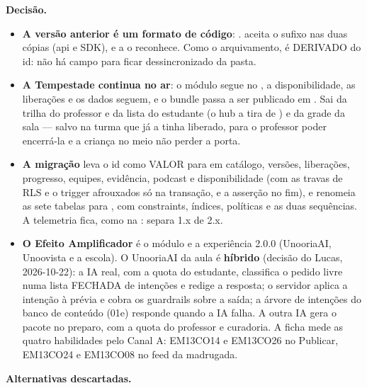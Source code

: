 \textbf{Decisão.}

\begin{itemize}
  \item \textbf{A versão anterior é um formato de código}: .
     aceita o sufixo nas duas cópias (api e SDK), e a
     o reconhece. Como o arquivamento, é DERIVADO do id:
    não há campo para ficar dessincronizado da pasta.
  \item \textbf{A Tempestade continua no ar}: o módulo  segue no
    , a disponibilidade, as liberações e os dados seguem, e o
    bundle passa a ser publicado em . Sai da trilha do
    professor e da lista do estudante (o hub a tira de
    ) e da grade da sala --- salvo na turma que já a
    tinha liberado, para o professor poder encerrá-la e a criança no meio não
    perder a porta.
  \item \textbf{A migração }
    leva o id como VALOR para  em catálogo, versões,
    liberações, progresso, equipes, evidência, podcast e disponibilidade
    (com as travas de RLS e o trigger afrouxados só na transação, e a asserção
    no fim), e renomeia as sete tabelas para , com
    constraints, índices, políticas e as duas sequências. A telemetria fica,
    como na :  separa 1.x de 2.x.
  \item \textbf{O Efeito Amplificador} é o módulo  e
    a experiência  2.0.0 (UnooriaAI, Unoovista e a escola). O
    UnooriaAI da aula é \textbf{híbrido} (decisão do Lucas, 2026-10-22): a IA
    real, com a quota do estudante, classifica o pedido livre numa lista
    FECHADA de intenções e redige a resposta; o servidor aplica a intenção à
    prévia e cobra os guardrails sobre a saída; a árvore de intenções do banco
    de conteúdo (01e) responde quando a IA falha. A outra IA gera o pacote no
    preparo, com a quota do professor e curadoria.
    A ficha mede as quatro habilidades pelo Canal A: EM13CO14 e EM13CO26 no
    Publicar, EM13CO24 e EM13CO08 no feed da madrugada.
\end{itemize}

\textbf{Alternativas descartadas.}

